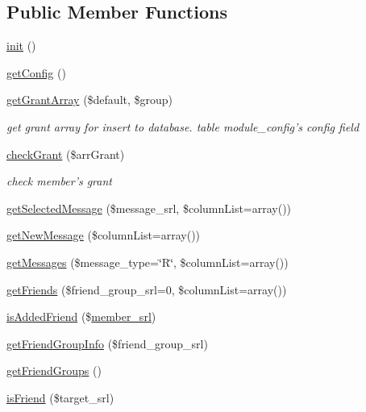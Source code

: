 \subsection*{Public Member Functions}
\begin{DoxyCompactItemize}
\item 
\hyperlink{classcommunicationModel_adff18c028fa89afeb6d7898fde5e2f91}{init} ()
\item 
\hyperlink{classcommunicationModel_ac19b1522d651d098b2d1a6f449a7b340}{get\-Config} ()
\item 
\hyperlink{classcommunicationModel_ac6a10f54e04888eed46f8fdd47b0d872}{get\-Grant\-Array} (\$default, \$group)
\begin{DoxyCompactList}\small\item\em get grant array for insert to database. table module\-\_\-config's config field \end{DoxyCompactList}\item 
\hyperlink{classcommunicationModel_ab4bd61605c27b1777d6322321dd3e421}{check\-Grant} (\$arr\-Grant)
\begin{DoxyCompactList}\small\item\em check member's grant \end{DoxyCompactList}\item 
\hyperlink{classcommunicationModel_a0224512523716ab204f6b91bea82aee4}{get\-Selected\-Message} (\$message\-\_\-srl, \$column\-List=array())
\item 
\hyperlink{classcommunicationModel_a2cc43556cb87f844b82814c2f49000bc}{get\-New\-Message} (\$column\-List=array())
\item 
\hyperlink{classcommunicationModel_ad742daa2376c03b70c5bf6389b10bfe7}{get\-Messages} (\$message\-\_\-type=\char`\"{}R\char`\"{}, \$column\-List=array())
\item 
\hyperlink{classcommunicationModel_a60f69cea7946be0bf4e874f2a5ab2c23}{get\-Friends} (\$friend\-\_\-group\-\_\-srl=0, \$column\-List=array())
\item 
\hyperlink{classcommunicationModel_a47441e7b20018de3fc6ab52bfb9b0d73}{is\-Added\-Friend} (\$\hyperlink{ko_8install_8php_aa61f9e08f0fe505094d26f8143f30bbd}{member\-\_\-srl})
\item 
\hyperlink{classcommunicationModel_a4ccd810d8c48ef4856da8fe986beb60a}{get\-Friend\-Group\-Info} (\$friend\-\_\-group\-\_\-srl)
\item 
\hyperlink{classcommunicationModel_a670b024aba464aee04e81fd2ae846fc5}{get\-Friend\-Groups} ()
\item 
\hyperlink{classcommunicationModel_a4e291316d5021ded0725169ada2a5dda}{is\-Friend} (\$target\-\_\-srl)
\end{DoxyCompactItemize}
